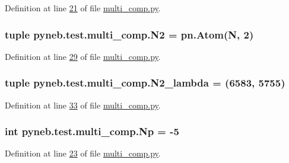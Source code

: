 Definition at line \hyperlink{multi__comp_8py_source_l00021}{21} of file \hyperlink{multi__comp_8py_source}{multi\+\_\+comp.\+py}.

\hypertarget{namespacepyneb_1_1test_1_1multi__comp_a7ee3bebe71b0ebfd1ae4e1026bf854d2}{}
\subsubsection[{N2}]{\setlength{\rightskip}{0pt plus 5cm}tuple pyneb.\+test.\+multi\+\_\+comp.\+N2 = pn.\+Atom(\textquotesingle{}N\textquotesingle{}, 2)}\label{namespacepyneb_1_1test_1_1multi__comp_a7ee3bebe71b0ebfd1ae4e1026bf854d2}


Definition at line \hyperlink{multi__comp_8py_source_l00029}{29} of file \hyperlink{multi__comp_8py_source}{multi\+\_\+comp.\+py}.

\hypertarget{namespacepyneb_1_1test_1_1multi__comp_a221d8a406c3127c62480d7f3bc0149e3}{}
\subsubsection[{N2\+\_\+lambda}]{\setlength{\rightskip}{0pt plus 5cm}tuple pyneb.\+test.\+multi\+\_\+comp.\+N2\+\_\+lambda = (6583, 5755)}\label{namespacepyneb_1_1test_1_1multi__comp_a221d8a406c3127c62480d7f3bc0149e3}


Definition at line \hyperlink{multi__comp_8py_source_l00033}{33} of file \hyperlink{multi__comp_8py_source}{multi\+\_\+comp.\+py}.

\hypertarget{namespacepyneb_1_1test_1_1multi__comp_a730973bb5d66cde8c39de757702e2116}{}
\subsubsection[{Np}]{\setlength{\rightskip}{0pt plus 5cm}int pyneb.\+test.\+multi\+\_\+comp.\+Np = -\/5}\label{namespacepyneb_1_1test_1_1multi__comp_a730973bb5d66cde8c39de757702e2116}


Definition at line \hyperlink{multi__comp_8py_source_l00023}{23} of file \hyperlink{multi__comp_8py_source}{multi\+\_\+comp.\+py}.

